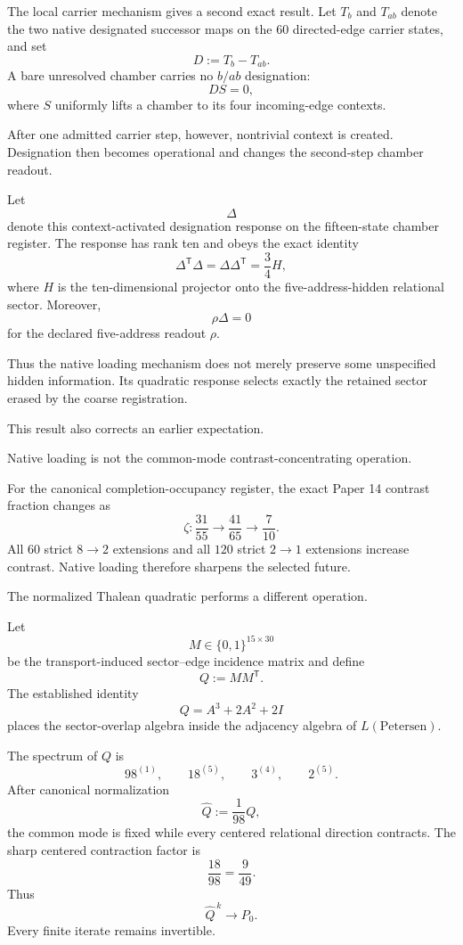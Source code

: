 The local carrier mechanism gives a second exact result.  Let
\(T_b\) and \(T_{ab}\) denote the two native designated successor
maps on the \(60\) directed-edge carrier states, and set
\[
D:=T_b-T_{ab}.
\]
A bare unresolved chamber carries no \(b/ab\) designation:
\[
DS=0,
\]
where \(S\) uniformly lifts a chamber to its four incoming-edge
contexts.

After one admitted carrier step, however, nontrivial context is
created.  Designation then becomes operational and changes the
second-step chamber readout.

Let
\[
\Delta
\]
denote this context-activated designation response on the
fifteen-state chamber register.  The response has rank ten and obeys
the exact identity
\[
\Delta^{\mathsf T}\Delta
=
\Delta\Delta^{\mathsf T}
=
\frac34H,
\]
where \(H\) is the ten-dimensional projector onto the
five-address-hidden relational sector.  Moreover,
\[
\rho\Delta=0
\]
for the declared five-address readout \(\rho\).

Thus the native loading mechanism does not merely preserve some
unspecified hidden information.  Its quadratic response selects
exactly the retained sector erased by the coarse registration.

This result also corrects an earlier expectation.

Native loading is not the common-mode contrast-concentrating
operation.

For the canonical completion-occupancy register, the exact Paper 14
contrast fraction changes as
\[
\zeta:
\frac{31}{55}
\longrightarrow
\frac{41}{65}
\longrightarrow
\frac{7}{10}.
\]
All \(60\) strict \(8\to2\) extensions and all \(120\) strict
\(2\to1\) extensions increase contrast.  Native loading therefore
sharpens the selected future.

The normalized Thalean quadratic performs a different operation.

Let
\[
M\in\{0,1\}^{15\times30}
\]
be the transport-induced sector--edge incidence matrix and define
\[
Q:=MM^{\mathsf T}.
\]
The established identity
\[
Q=A^3+2A^2+2I
\]
places the sector-overlap algebra inside the adjacency algebra of
\(L(\mathrm{Petersen})\).

The spectrum of \(Q\) is
\[
98^{(1)},\qquad
18^{(5)},\qquad
3^{(4)},\qquad
2^{(5)}.
\]
After canonical normalization
\[
\widehat Q:=\frac1{98}Q,
\]
the common mode is fixed while every centered relational direction
contracts.  The sharp centered contraction factor is
\[
\frac{18}{98}=\frac9{49}.
\]
Thus
\[
\widehat Q^{\,k}\longrightarrow P_0.
\]
Every finite iterate remains invertible.


